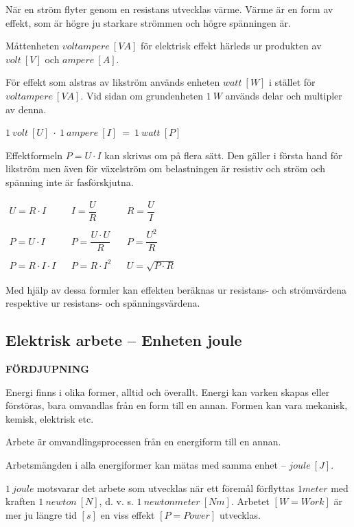 När en ström flyter genom en resistans utvecklas värme.
Värme är en form av effekt, som är högre ju starkare strömmen och högre
spänningen är.

Måttenheten \(voltampere\ [VA]\) för elektrisk effekt härleds ur produkten av
\(volt\ [V]\) och \(ampere\ [A]\).

För effekt som alstras av likström används enheten \(watt\ [W]\) i stället för
\(voltampere\ [VA]\).
Vid sidan om grundenheten \(1\ W\) används delar och multipler av denna.

\(1\ volt\ [U]\ \cdot\ 1\ ampere\ [I]\ =\ 1\ watt\ [P]\)

Effektformeln \(P = U \cdot I\) kan skrivas om på flera sätt.
Den gäller i första hand för likström men även för växelström om belastningen är
resistiv och ström och spänning inte är fasförskjutna.

\(
\begin{array}{lllll}
U = R \cdot I & & I = \dfrac{U}{R} & & R = \dfrac{U}{I}\\ \\
P = U \cdot I & & P = \dfrac{U \cdot U }{R} & & P = \dfrac{U^2}{R}\\ \\
P = R \cdot I \cdot I & & P = R \cdot I^2 & & U = \sqrt{P \cdot R}
\end{array}
\)

Med hjälp av dessa formler kan effekten beräknas ur resistans- och strömvärdena
respektive ur resistans- och spänningsvärdena.

\subsection{Elektrisk arbete -- Enheten joule}
\textbf{FÖRDJUPNING}

Energi finns i olika former, alltid och överallt.
Energi kan varken skapas eller förstöras, bara omvandlas från en form till en
annan.
Formen kan vara mekanisk, kemisk, elektrisk etc.

Arbete är omvandlingsprocessen från en energiform till en annan.

Arbetsmängden i alla energiformer kan mätas med samma enhet -- \(joule\ [J]\).

\(1\ joule\) motsvarar det arbete som utvecklas när ett föremål förflyttas
\(1 meter\) med kraften \(1\ newton\ [N]\), d. v. s. \(1\ newtonmeter\ [Nm]\).
Arbetet \([W=Work]\) är mer ju längre tid \([s]\) en viss effekt \([P=Power]\)
utvecklas.

